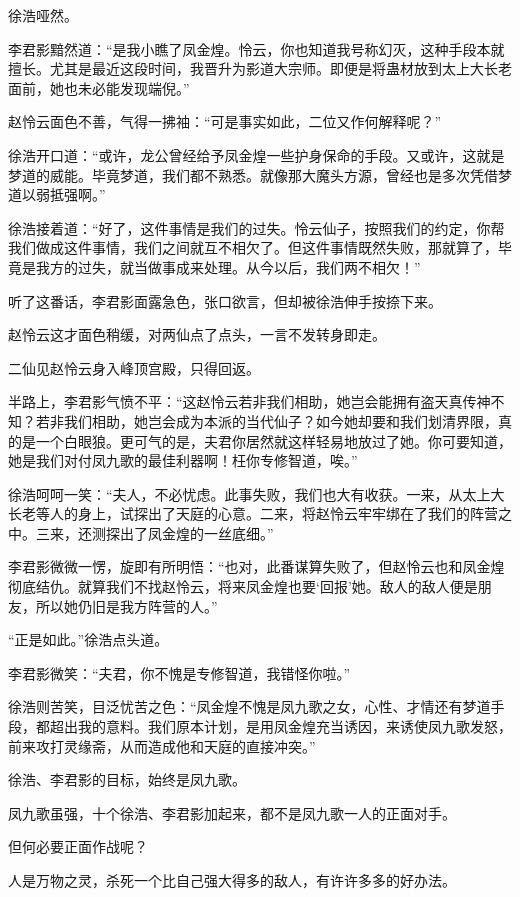 \begin{this_body}
徐浩哑然。

李君影黯然道：“是我小瞧了凤金煌。怜云，你也知道我号称幻灭，这种手段本就擅长。尤其是最近这段时间，我晋升为影道大宗师。即便是将蛊材放到太上大长老面前，她也未必能发现端倪。”

赵怜云面色不善，气得一拂袖：“可是事实如此，二位又作何解释呢？”

徐浩开口道：“或许，龙公曾经给予凤金煌一些护身保命的手段。又或许，这就是梦道的威能。毕竟梦道，我们都不熟悉。就像那大魔头方源，曾经也是多次凭借梦道以弱抵强啊。”

徐浩接着道：“好了，这件事情是我们的过失。怜云仙子，按照我们的约定，你帮我们做成这件事情，我们之间就互不相欠了。但这件事情既然失败，那就算了，毕竟是我方的过失，就当做事成来处理。从今以后，我们两不相欠！”

听了这番话，李君影面露急色，张口欲言，但却被徐浩伸手按捺下来。

赵怜云这才面色稍缓，对两仙点了点头，一言不发转身即走。

二仙见赵怜云身入峰顶宫殿，只得回返。

半路上，李君影气愤不平：“这赵怜云若非我们相助，她岂会能拥有盗天真传神不知？若非我们相助，她岂会成为本派的当代仙子？如今她却要和我们划清界限，真的是一个白眼狼。更可气的是，夫君你居然就这样轻易地放过了她。你可要知道，她是我们对付凤九歌的最佳利器啊！枉你专修智道，唉。”

徐浩呵呵一笑：“夫人，不必忧虑。此事失败，我们也大有收获。一来，从太上大长老等人的身上，试探出了天庭的心意。二来，将赵怜云牢牢绑在了我们的阵营之中。三来，还测探出了凤金煌的一丝底细。”

李君影微微一愣，旋即有所明悟：“也对，此番谋算失败了，但赵怜云也和凤金煌彻底结仇。就算我们不找赵怜云，将来凤金煌也要‘回报’她。敌人的敌人便是朋友，所以她仍旧是我方阵营的人。”

“正是如此。”徐浩点头道。

李君影微笑：“夫君，你不愧是专修智道，我错怪你啦。”

徐浩则苦笑，目泛忧苦之色：“凤金煌不愧是凤九歌之女，心性、才情还有梦道手段，都超出我的意料。我们原本计划，是用凤金煌充当诱因，来诱使凤九歌发怒，前来攻打灵缘斋，从而造成他和天庭的直接冲突。”

徐浩、李君影的目标，始终是凤九歌。

凤九歌虽强，十个徐浩、李君影加起来，都不是凤九歌一人的正面对手。

但何必要正面作战呢？

人是万物之灵，杀死一个比自己强大得多的敌人，有许许多多的好办法。


\end{this_body}
